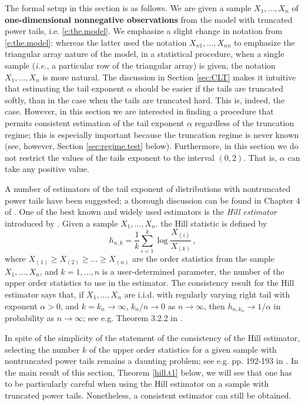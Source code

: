 \documentclass[11pt]{amsart}
\numberwithin{equation}{section}
\begin{document}
The formal setup in this section is as follows. We are given a
sample $X_1,\ldots, X_n$ of {\bf one-dimensional nonnegative
observations} from the model with truncated power tails, i.e.
\eqref{e:the.model}. We emphasize a slight change in notation from
\eqref{e:the.model}: whereas the latter used the notation
$X_{n1},\ldots, X_{nn}$ to emphasize the triangular array nature
of the model, in a statistical procedure, when a single sample
({\it i.e.}, a particular row of the triangular array) is given,
the notation $X_1,\ldots, X_n$ is more natural. The discussion in
Section \ref{sec:CLT} makes it intuitive that estimating the tail
exponent $\alpha$ should be easier if the tails are truncated
softly, than in the case when the tails are truncated hard. This
is, indeed, the case. However, in this section we are interested
in finding a procedure that permits consistent estimation of the
tail exponent $\alpha$ regardless of the truncation regime; this
is especially important because the truncation regime is never
known (see, however, Section \ref{sec:regime.test} below).
Furthermore, in this section we do not restrict the values of the
tails exponent to the interval $(0,2)$. That is, $\alpha$ can take
any positive value.

A number of estimators of the tail exponent of distributions with
nontruncated power tails
have been suggested; a thorough discussion can
be found in Chapter 4 of \cite{dehaan:ferreira:2006}. One of the best
known and widely used estimators is the {\it Hill estimator}
introduced by \cite{hill:1975}. Given a sample $X_1,\ldots, X_n$. the
Hill statistic is defined by
\begin{equation} \label{e;hill}
h_{n,k} = \frac1{k}\sum_{i=1}^{k}\log\frac{X_{(i)}}{X_{(k)}}\,,
\end{equation}
where $X_{(1)}\ge X_{(2)}\ge\ldots\ge X_{(n)}$ are the order
statistics from the sample $X_{1},\ldots,X_{n}$, and $k=1,\ldots, n$
is a user-determined parameter, the number of the upper order
statistics to use in the estimator. The consistency result for the
Hill estimator says that, if $X_1,\ldots, X_n$ are i.i.d. with
regularly varying right tail with exponent $\alpha>0$, and
$k=k_n\to\infty$, $k_n/n\to 0$ as $n\to\infty$, then $h_{n,k_n} \to
1/\alpha$ in probability as $n\to\infty$; see e.g. Theorem 3.2.2 in
\cite{dehaan:ferreira:2006}.

In spite of the simplicity of the  statement of the consistency of
the Hill estimator, selecting the  number $k$ of the upper order
statistics for a given sample with nontruncated power tails
remains a daunting problem; see e.g. pp. 192-193 in
\cite{embrechts:kluppelberg:mikosch:1997}. In the main result of
this section, Theorem \ref{hill.t1} below, we will see that one
has to be particularly careful when using the Hill estimator on a
sample with truncated power tails. Nonetheless, a consistent
estimator can still be obtained.
\end{document}
